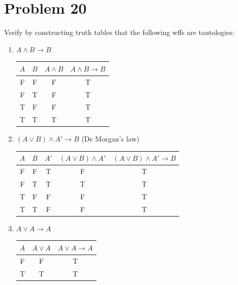 \documentclass[12pt]{article}
\begin{document}
\newpage
\section*{Problem 20}
Verify by constructing truth tables that the following wffs are tautologies:
\begin{enumerate}
    \item \( A \land B \rightarrow B \)

\begin{tabular}{cc|c|c}
\( A \) & \( B \) & \( A \land B \) & \( A \land B \rightarrow B \) \\
\hline
F & F & F & T \\
F & T & F & T \\
T & F & F & T \\
T & T & T & T \\
\end{tabular}

    \item \( (A \lor B) \land A' \rightarrow B \) (De Morgan's law)

\begin{tabular}{cc|c|c|c}
\( A \) & \( B \) & \( A' \) & \( (A \lor B) \land A' \) & \( (A \lor B) \land A' \rightarrow B \) \\
\hline
F & F & T & F & T \\
F & T & T & T & T \\
T & F & F & F & T \\
T & T & F & F & T \\
\end{tabular}

    \item \( A \lor A \rightarrow A \)

\begin{tabular}{c|c|c}
\( A \) & \( A \lor A \) & \( A \lor A \rightarrow A \) \\
\hline
F & F & T \\
T & T & T \\
\end{tabular}
\end{enumerate}
\end{document}
